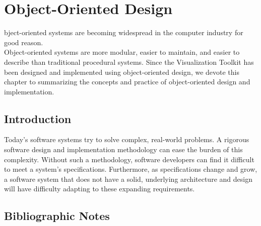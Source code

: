 \chapter{Object-Oriented Design}
\label{chap:ood}

bject-oriented systems are becoming widespread in
the computer industry for good reason. \\Object-oriented systems are more modular, easier to maintain, and easier to describe than traditional procedural systems. Since the Visualization Toolkit has been designed and implemented using object-oriented design, we devote this chapter to summarizing the concepts and practice of object-oriented design and implementation.

\section{Introduction}
Today’s software systems try to solve complex, real-world problems. A rigorous software design and implementation methodology can ease the burden of this complexity. Without such a methodology, software developers can find it difficult to meet a system’s specifications. Furthermore, as specifications change and grow, a software system that does not have a solid, underlying architecture and design will have difficulty adapting to these expanding requirements.

\section{Bibliographic Notes}


\printbibliography